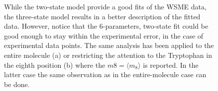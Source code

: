 \begin{figure}
{%
While the two-state model provide a good fits of the WSME data, the three-state
model results in a better description of the fitted data. However, notice that
the 6-parameters, two-state fit could be  good
enough to stay within the experimental error, in the case of experimental data
points.
The same analysis has been applied to the entire molecule (a) or restricting the
attention to the Tryptophan in the eighth position (b) where the $m8=\langle
m_8\rangle$ is reported.
In the latter case the same observation as in the entire-molecule case can be
done.
}
\end{figure}


